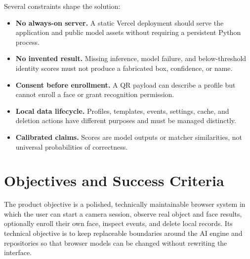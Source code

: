 \documentclass[11pt,oneside,openany]{report}
\begin{document}
Several constraints shape the solution:
\begin{itemize}
  \item \textbf{No always-on server.} A static Vercel deployment should serve the application and public model assets without requiring a persistent Python process.
  \item \textbf{No invented result.} Missing inference, model failure, and below-threshold identity scores must not produce a fabricated box, confidence, or name.
  \item \textbf{Consent before enrollment.} A QR payload can describe a profile but cannot enroll a face or grant recognition permission.
  \item \textbf{Local data lifecycle.} Profiles, templates, events, settings, cache, and deletion actions have different purposes and must be managed distinctly.
  \item \textbf{Calibrated claims.} Scores are model outputs or matcher similarities, not universal probabilities of correctness.
\end{itemize}

\chapter{Objectives and Success Criteria}
The product objective is a polished, technically maintainable browser system in which the user can start a camera session, observe real object and face results, optionally enroll their own face, inspect events, and delete local records. Its technical objective is to keep replaceable boundaries around the AI engine and repositories so that browser models can be changed without rewriting the interface.
\end{document}
